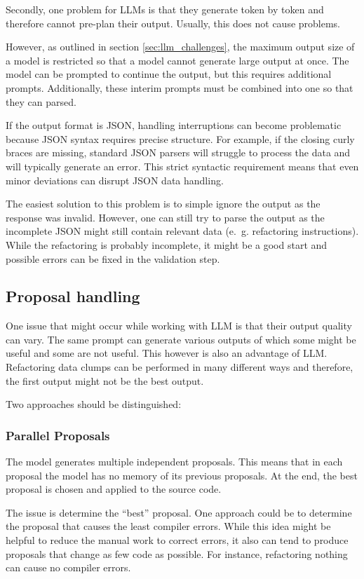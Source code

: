 Secondly, one problem for \acp{LLM} is that they generate token by token and therefore cannot pre-plan their output. Usually, this does not cause problems. 

However, as outlined in section \ref{sec:llm_challenges}, the maximum output size of a model is restricted so that a model cannot generate large output at once. The model can be prompted to continue the output, but this requires additional prompts. Additionally, these interim prompts must be combined into one so that they can parsed.

If the output format is JSON, handling interruptions can become problematic because JSON syntax requires precise structure. For example, if the closing curly braces are missing, standard JSON parsers will struggle to process the data and will typically generate an error. This strict syntactic requirement means that even minor deviations can disrupt JSON data handling.

The easiest solution to this problem is to simple ignore the output as the response was invalid. 
However,  one can still try to parse the output as the incomplete \ac{JSON} might still contain relevant data (e.~g. refactoring instructions). While the refactoring is probably incomplete, it might be a good start and possible errors can be fixed in the validation step.


\subsection{Proposal handling}

One issue that might occur while working with \ac{LLM} is that their output quality can vary. The same prompt can generate various outputs of which some might be useful and some are not useful. This however is also an advantage of \acs{LLM}. Refactoring data clumps can be performed in many different ways and therefore, the first output might not be the best output. 

Two approaches should be distinguished:
\subsubsection{Parallel Proposals}
The model generates multiple independent proposals. This means that in each proposal the model has no memory of its previous proposals. At the end, the best proposal is chosen and applied to the source code.

The issue is determine the \enquote{best} proposal. One approach could be to determine the proposal that causes the least compiler errors. While this idea might be helpful to reduce the manual work to correct errors, it also can tend to produce proposals that change as few code as possible. For instance, refactoring nothing can cause no compiler errors.

